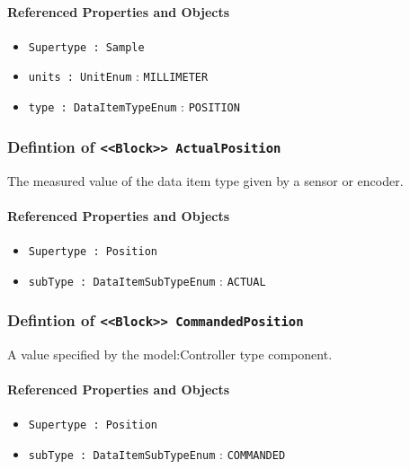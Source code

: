 \FloatBarrier
\paragraph{Referenced Properties and Objects}

\begin{itemize}
\item \texttt{Supertype : Sample}

\item \texttt{units : UnitEnum} : \texttt{MILLIMETER}

\item \texttt{type : DataItemTypeEnum} : \texttt{POSITION}

\end{itemize}
\FloatBarrier
\subsubsection{Defintion of \texttt{<<Block>> ActualPosition}}
  \label{type:ActualPosition}

\FloatBarrier

The measured value of the data item type given by a sensor or encoder.

\FloatBarrier
\paragraph{Referenced Properties and Objects}

\begin{itemize}
\item \texttt{Supertype : Position}

\item \texttt{subType : DataItemSubTypeEnum} : \texttt{ACTUAL}

\end{itemize}
\FloatBarrier
\subsubsection{Defintion of \texttt{<<Block>> CommandedPosition}}
  \label{type:CommandedPosition}

\FloatBarrier

A value specified by the {model:Controller} type component.

\FloatBarrier
\paragraph{Referenced Properties and Objects}

\begin{itemize}
\item \texttt{Supertype : Position}

\item \texttt{subType : DataItemSubTypeEnum} : \texttt{COMMANDED}

\end{itemize}
\FloatBarrier
